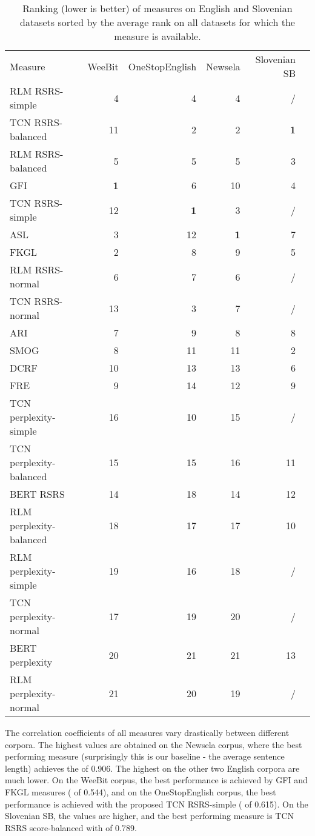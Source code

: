 \documentclass{clv3}
\begin{document}
\begin{table*}[t]
\begin{center}
\caption{Ranking (lower is better) of measures on English and Slovenian datasets sorted by the average rank on all datasets for which the measure is available.}
\begin{tabular}{lrrrrr}
    \hline
    Measure & WeeBit & OneStopEnglish & Newsela & Slovenian SB \\
    RLM RSRS-simple & 4 & 4 & 4 & /  \\
    TCN RSRS-balanced & 11 & 2 & 2 & \textbf{1}  \\
    RLM RSRS-balanced & 5 & 5 & 5 & 3  \\
    GFI & \textbf{1} & 6 & 10 & 4  \\
    TCN RSRS-simple & 12 & \textbf{1} & 3 & /  \\
    ASL & 3 & 12 & \textbf{1} & 7  \\
    FKGL & 2 & 8 & 9 & 5  \\
    RLM RSRS-normal & 6 & 7 & 6 & /  \\
    TCN RSRS-normal & 13 & 3 & 7 & /  \\
    ARI & 7 & 9 & 8 & 8  \\
    SMOG & 8 & 11 & 11 & 2  \\
    DCRF & 10 & 13 & 13 & 6  \\
    FRE & 9 & 14 & 12 & 9  \\
    TCN perplexity-simple & 16 & 10 & 15 & / \\
    TCN perplexity-balanced & 15 & 15 & 16 & 11 \\
    BERT RSRS & 14 & 18 & 14 & 12  \\
    RLM perplexity-balanced & 18 & 17 & 17 & 10  \\
    RLM perplexity-simple & 19 & 16 & 18 & / \\
    TCN perplexity-normal & 17 & 19 & 20 & /  \\
    BERT perplexity & 20 & 21 & 21 & 13  \\
    RLM perplexity-normal & 21 & 20 & 19 & / \\
    \hline
\end{tabular}
\label{table:rankEng}
 \end{center}
\end{table*}


The correlation coefficients of all measures vary drastically between different corpora. The highest  values are obtained on the Newsela corpus, where the best performing measure (surprisingly this is our baseline - the average sentence length) achieves the  of 0.906. The highest  on the other two English corpora are much lower. On the WeeBit corpus, the best performance is achieved by GFI and FKGL measures ( of 0.544), and on the OneStopEnglish corpus, the best performance is achieved with the proposed TCN RSRS-simple ( of 0.615). On the Slovenian SB, the  values are higher, and the best performing measure is TCN RSRS score-balanced with  of 0.789.
\end{document}
